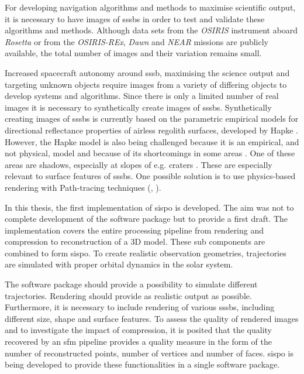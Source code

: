 For developing navigation algorithms and methods to maximise scientific output, it is necessary to have images of \gls{sssb}s in order to test and validate these algorithms and methods. Although data sets from the \textit{OSIRIS} instrument aboard \textit{Rosetta} \cite{osirisArchive} or from the \textit{OSIRIS-REx}, \textit{Dawn} and \textit{NEAR} missions \cite{palmer2014small} are publicly available, the total number of images and their variation remains small.

Increased spacecraft autonomy around \gls{sssb}, maximising the science output and targeting unknown objects require images from a variety of differing objects to develop systems and algorithms. Since there is only a limited number of real images it is necessary to synthetically create images of \gls{sssb}s. Synthetically creating images of \gls{sssb}s is currently based on the parametric empirical models for directional reflectance properties of airless regolith surfaces, developed by Hapke \cite{hapke1981bidirectional, hapke1981bidirectional2, hapke1984bidirectional, hapke1986bidirectional, hapke2002bidirectional, hapke2008bidirectional, hapke2012bidirectional}. However, the Hapke model is also being challenged because it is an empirical, and not physical, model and because of its shortcomings in some areas \cite{shkuratov2012critical}. One of these areas are shadows, especially at slopes of e.g. craters \cite{shkuratov2012critical}. These are especially relevant to surface features of \gls{sssb}s. One possible solution is to use physics-based rendering with Path-tracing techniques (\cite{shkuratov2012critical}, \cite{lafortune1996mathematical}).

In this thesis, the first implementation of \gls{sispo} is developed. The aim was not to complete development of the software package but to provide a first draft. The implementation covers the entire processing pipeline from rendering and compression to reconstruction of a 3D model. These sub components are combined to form \gls{sispo}. To create realistic observation geometries, trajectories are simulated with proper orbital dynamics in the solar system.

The software package should provide a possibility to simulate different trajectories. Rendering should provide as realistic output as possible. Furthermore, it is necessary to include rendering of various \gls{sssb}s, including different size, shape and surface features. To assess the quality of rendered images and to investigate the impact of compression, it is posited that the quality recovered by an \gls{sfm} pipeline provides a quality measure in the form of the number of reconstructed points, number of vertices and number of faces. \gls{sispo} is being developed to provide these functionalities in a single software package.

